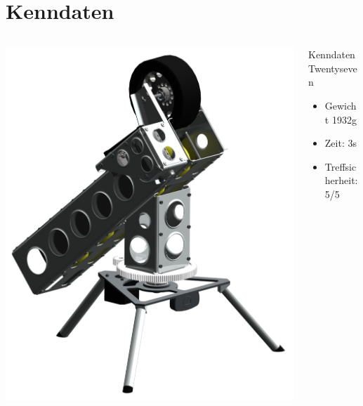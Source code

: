\section{Kenndaten}
\begin{frame}
    \begin{columns}
        \begin{column}{0.50\textwidth}
            \centering
            \includegraphics[width=1.00\textwidth]{../doc/fig/Bild_mit_Kamera.png}
        \end{column}
        \begin{column}{0.50\textwidth}
            \begin{block}{Kenndaten Twentyseven}
                \begin{itemize}
                    \item Gewicht 1932\si{\gram}
                    \item Zeit: 3\si{\second}
                    \item Treffsicherheit: 5/5
                \end{itemize}
            \end{block}
        \end{column}
    \end{columns}
\end{frame}
